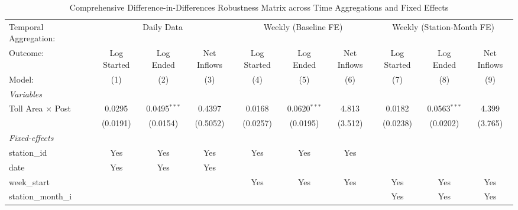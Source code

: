 
\begin{landscape}
   \begin{table}[htbp]
      
      \caption{\label{tab:did_master_matrix} Comprehensive Difference-in-Differences Robustness Matrix across Time Aggregations and Fixed Effects}
      
      \centering
      
      
      \begin{tabular}{lccccccccc}
         \tabularnewline \midrule \midrule
         
         Temporal Aggregation: & \multicolumn{3}{c}{Daily Data} & \multicolumn{3}{c}{Weekly (Baseline FE)} & \multicolumn{3}{c}{Weekly (Station-Month FE)} \\ 
         Outcome:                 & Log Started & Log Ended      & Net Inflows & Log Started & Log Ended      & Net Inflows & Log Started & Log Ended      & Net Inflows \\   
         
         Model:                   & (1)         & (2)            & (3)         & (4)         & (5)            & (6)         & (7)         & (8)            & (9)\\  
         
         \midrule
         \emph{Variables}\\
         
         Toll Area $\times$ Post  & 0.0295      & 0.0495$^{***}$ & 0.4397      & 0.0168      & 0.0620$^{***}$ & 4.813       & 0.0182      & 0.0563$^{***}$ & 4.399\\   
                                  & (0.0191)    & (0.0154)       & (0.5052)    & (0.0257)    & (0.0195)       & (3.512)     & (0.0238)    & (0.0202)       & (3.765)\\   
         
         \midrule
         \emph{Fixed-effects}\\
         
         station\_id              & Yes         & Yes            & Yes         & Yes         & Yes            & Yes         &             &                & \\  
         date                     & Yes         & Yes            & Yes         &             &                &             &             &                & \\  
         week\_start              &             &                &             & Yes         & Yes            & Yes         & Yes         & Yes            & Yes\\  
         station\_month\_i        &             &                &             &             &                &             & Yes         & Yes            & Yes\\  
         

\end{tabular}
\end{table}
\end{landscape}
